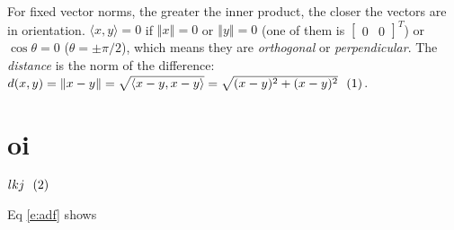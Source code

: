 \documentclass[9pt, twocolumn]{extarticle}
\theoremstyle{definition}
\newcommand{\inlineeqnum}{\refstepcounter{equation}~~\mbox{(\theequation)}}
\newcommand{\norm}[1]{\left\Vert #1\right\Vert}
\begin{document}
  For fixed vector norms, the greater the inner product, the closer the vectors are in orientation. $\langle x,y\rangle=0$ if $\norm{x}=0$ or $ \norm{y}=0 $ (one of them is $ \begin{bmatrix}0&0 \end{bmatrix}^T $) or $ \cos\theta=0 $ ($ \theta=\pm\pi/2 $), which means they are \emph{orthogonal} or \emph{perpendicular}. The \emph{distance} is the norm of the difference: $d(x,y)=\norm{x-y}=\sqrt{\langle x-y, x-y\rangle}=\sqrt{(x-y)^2+(x-y)^2}\inlineeqnum$.
  \section{oi}
  $lkj\inlineeqnum\label{e:adf}$
  
  Eq \ref{e:adf} shows
  
	\lipsum[1-30]
\end{document}
